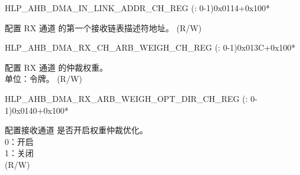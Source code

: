 \begin{register}{H}{LP\_AHB\_DMA\_IN\_LINK\_ADDR\_CH\_REG (: 0-1)}{0x0114+0x100*}\label{regdesc:LPAHBDMAINLINKADDRCHNREG}
%
\regnewline%
\begin{regdesc}\begin{reglist}
\label{fielddesc:LPAHBDMAINLINKADDRCHN}\item [LP\_AHB\_DMA\_INLINK\_ADDR\_CH\regindex{n}] 配置 RX 通道  的第一个接收链表描述符地址。 (R/W)
\end{reglist}\end{regdesc}
\end{register}


\begin{register}{H}{LP\_AHB\_DMA\_RX\_CH\_ARB\_WEIGH\_CH\_REG (: 0-1)}{0x013C+0x100*}\label{regdesc:LPAHBDMARXCHARBWEIGHCHNREG}
%
%
\regnewline%
\begin{regdesc}\begin{reglist}
\label{fielddesc:LPAHBDMARXCHARBWEIGHCHN}\item [LP\_AHB\_DMA\_RX\_CH\_ARB\_WEIGH\_CH\regindex{n}] 配置 RX 通道  的仲裁权重。\\单位：令牌。 (R/W)
\end{reglist}\end{regdesc}
\end{register}


\begin{register}{H}{LP\_AHB\_DMA\_RX\_ARB\_WEIGH\_OPT\_DIR\_CH\_REG (: 0-1)}{0x0140+0x100*}\label{regdesc:LPAHBDMARXARBWEIGHOPTDIRCHNREG}
%
%
\regnewline%
\begin{regdesc}\begin{reglist}
\label{fielddesc:LPAHBDMARXARBWEIGHOPTDIRCHN}\item [LP\_AHB\_DMA\_RX\_ARB\_WEIGH\_OPT\_DIR\_CH\regindex{n}] 配置接收通道  是否开启权重仲裁优化。\\
0：开启\\
1：关闭\\ (R/W)
\end{reglist}\end{regdesc}
\end{register}


